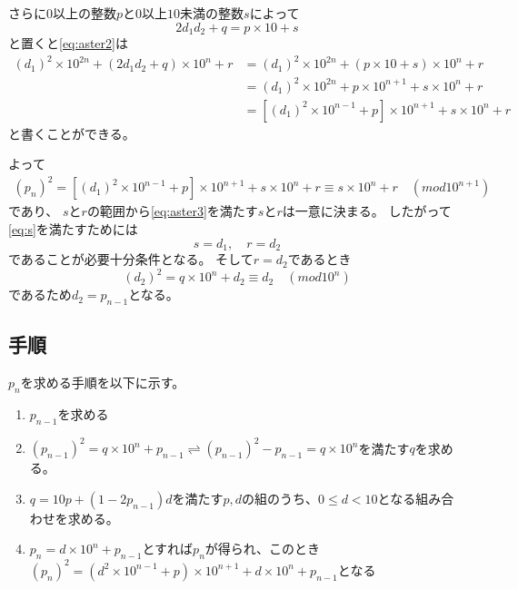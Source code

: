 \documentclass[uplatex, 11pt, a4j, dvipdfmx]{jsarticle}
\begin{document}
  さらに$0$以上の整数$p$と$0$以上$10$未満の整数$s$によって
  \begin{equation}
    2 d_1 d_2 + q = p \times 10 + s
  \end{equation}
  と置くと\cref{eq:aster2}は
  \begin{equation} \begin{aligned}
    (d_1)^2 \times 10^{2n} + (2 d_1 d_2 + q) \times 10^n + r
            &= (d_1)^2 \times 10^{2n} + (p \times 10 + s) \times 10^n + r \\
            &= (d_1)^2 \times 10^{2n} + p \times 10^{n+1} + s \times 10^n + r \\
            &= \left[ (d_1)^2 \times 10^{n-1} + p \right] \times 10^{n+1} + s \times 10^n + r \label{eq:aster3}
  \end{aligned} \end{equation}
  と書くことができる。

  よって
  \begin{equation} \begin{aligned}
    (p_n)^2 = \left[ (d_1)^2 \times 10^{n-1} + p \right] \times 10^{n+1} + s \times 10^n + r
                                                                    \equiv s \times 10^n + r \quad (mod 10^{n+1})
  \end{aligned} \end{equation}
  であり、 $s$と$r$の範囲から\cref{eq:aster3}を満たす$s$と$r$は一意に決まる。
  したがって\cref{eq:s}を満たすためには
  \begin{equation}
    s = d_1, \quad r = d_2
  \end{equation}
  であることが必要十分条件となる。
  そして$r = d_2$であるとき
  \begin{equation}
    (d_2)^2 = q \times 10^n + d_2 \equiv d_2 \quad (mod 10^n)
  \end{equation}
  であるため$d_2 = p_{n-1}$となる。

  \subsection{手順}
    $p_n$を求める手順を以下に示す。
    \begin{enumerate}
      \item $p_{n-1}$を求める
      \item $(p_{n-1})^2 = q \times 10^n + p_{n-1} \rightleftharpoons (p_{n-1})^2 - p_{n-1} = q \times 10^n$を満たす$q$を求める。
      \item $q = 10 p + (1 - 2 p_{n-1}) d$を満たす$p, d$の組のうち、$0 \leq d < 10$となる組み合わせを求める。
      \item $p_n = d \times 10^n + p_{n-1}$とすれば$p_n$が得られ、このとき$(p_n)^2 = \left( d^2 \times 10^{n-1} + p \right) \times 10^{n+1} + d \times 10^n + p_{n-1}$となる
    \end{enumerate}
\end{document}
